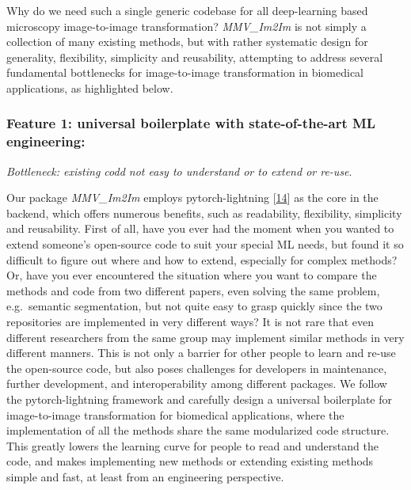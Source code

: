 Why do we need such a single generic codebase for all deep-learning based microscopy image-to-image transformation? \emph{MMV\_Im2Im} is not simply a collection of many existing methods, but with rather systematic design for generality, flexibility, simplicity and reusability, attempting to address several fundamental bottlenecks for image-to-image transformation in biomedical applications, as highlighted below.

\hypertarget{feature-1-universal-boilerplate-with-state-of-the-art-ml-engineering}{%
\subsubsection{Feature 1: universal boilerplate with state-of-the-art ML engineering:}\label{feature-1-universal-boilerplate-with-state-of-the-art-ml-engineering}}

\emph{Bottleneck: existing codd not easy to understand or to extend or re-use}.

Our package \emph{MMV\_Im2Im} employs pytorch-lightning {[}\protect\hyperlink{ref-YbvSvdyB}{14}{]} as the core in the backend, which offers numerous benefits, such as readability, flexibility, simplicity and reusability. First of all, have you ever had the moment when you wanted to extend someone's open-source code to suit your special ML needs, but found it so difficult to figure out where and how to extend, especially for complex methods? Or, have you ever encountered the situation where you want to compare the methods and code from two different papers, even solving the same problem, e.g.~semantic segmentation, but not quite easy to grasp quickly since the two repositories are implemented in very different ways? It is not rare that even different researchers from the same group may implement similar methods in very different manners. This is not only a barrier for other people to learn and re-use the open-source code, but also poses challenges for developers in maintenance, further development, and interoperability among different packages.
We follow the pytorch-lightning framework and carefully design a universal boilerplate for image-to-image transformation for biomedical applications, where the implementation of all the methods share the same modularized code structure. This greatly lowers the learning curve for people to read and understand the code, and makes implementing new methods or extending existing methods simple and fast, at least from an engineering perspective.

